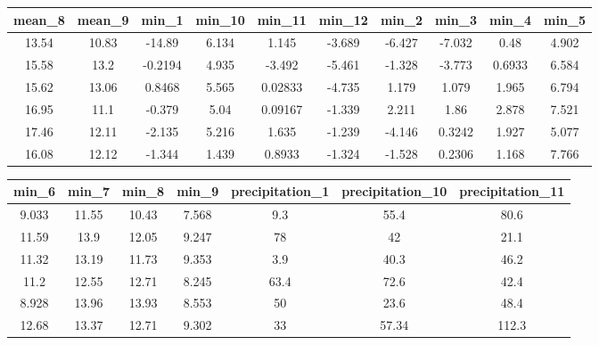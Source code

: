 \documentclass[10pt,]{article}
\begin{document}
\begin{longtable}[]{@{}cccccccccc@{}}
\toprule
mean\_8 & mean\_9 & min\_1 & min\_10 & min\_11 & min\_12 & min\_2 &
min\_3 & min\_4 & min\_5\tabularnewline
\midrule
\endhead
13.54 & 10.83 & -14.89 & 6.134 & 1.145 & -3.689 & -6.427 & -7.032 & 0.48
& 4.902\tabularnewline
15.58 & 13.2 & -0.2194 & 4.935 & -3.492 & -5.461 & -1.328 & -3.773 &
0.6933 & 6.584\tabularnewline
15.62 & 13.06 & 0.8468 & 5.565 & 0.02833 & -4.735 & 1.179 & 1.079 &
1.965 & 6.794\tabularnewline
16.95 & 11.1 & -0.379 & 5.04 & 0.09167 & -1.339 & 2.211 & 1.86 & 2.878 &
7.521\tabularnewline
17.46 & 12.11 & -2.135 & 5.216 & 1.635 & -1.239 & -4.146 & 0.3242 &
1.927 & 5.077\tabularnewline
16.08 & 12.12 & -1.344 & 1.439 & 0.8933 & -1.324 & -1.528 & 0.2306 &
1.168 & 7.766\tabularnewline
\bottomrule
\end{longtable}

\begin{longtable}[]{@{}ccccccc@{}}
\toprule
min\_6 & min\_7 & min\_8 & min\_9 & precipitation\_1 & precipitation\_10
& precipitation\_11\tabularnewline
\midrule
\endhead
9.033 & 11.55 & 10.43 & 7.568 & 9.3 & 55.4 & 80.6\tabularnewline
11.59 & 13.9 & 12.05 & 9.247 & 78 & 42 & 21.1\tabularnewline
11.32 & 13.19 & 11.73 & 9.353 & 3.9 & 40.3 & 46.2\tabularnewline
11.2 & 12.55 & 12.71 & 8.245 & 63.4 & 72.6 & 42.4\tabularnewline
8.928 & 13.96 & 13.93 & 8.553 & 50 & 23.6 & 48.4\tabularnewline
12.68 & 13.37 & 12.71 & 9.302 & 33 & 57.34 & 112.3\tabularnewline
\bottomrule
\end{longtable}
\end{document}
